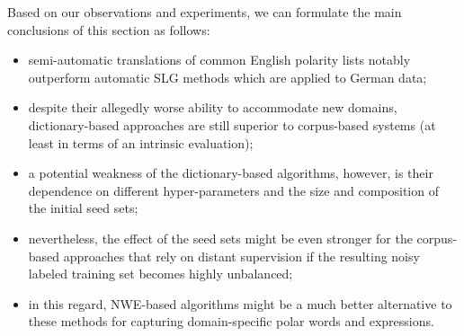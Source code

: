 Based on our observations and experiments, we can formulate the main
conclusions of this section as follows:
\begin{itemize}
\item semi-automatic translations of common English polarity lists
  notably outperform automatic SLG methods which are applied to German
  data;
\item despite their allegedly worse ability to accommodate new
  domains, dictionary-based approaches are still superior to
  corpus-based systems (at least in terms of an intrinsic evaluation);
\item a potential weakness of the dictionary-based algorithms,
  however, is their dependence on different hyper-parameters and the
  size and composition of the initial seed sets;
\item nevertheless, the effect of the seed sets might be even stronger
  for the corpus-based approaches that rely on distant supervision if
  the resulting noisy labeled training set becomes highly unbalanced;
\item in this regard, NWE-based algorithms might be a much better
  alternative to these methods for capturing domain-specific polar
  words and expressions.
\end{itemize}
